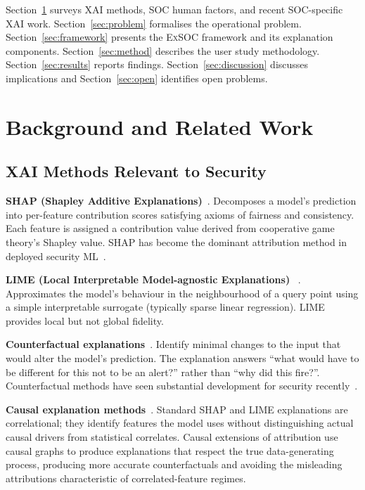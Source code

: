 \documentclass[sigconf,nonacm]{acmart}
\begin{document}
Section~\ref{sec:background} surveys XAI methods, SOC human factors, and
recent SOC-specific XAI work. Section~\ref{sec:problem} formalises the
operational problem. Section~\ref{sec:framework} presents the
\textsc{ExSOC} framework and its explanation components.
Section~\ref{sec:method} describes the user study methodology.
Section~\ref{sec:results} reports findings. Section~\ref{sec:discussion}
discusses implications and Section~\ref{sec:open} identifies open problems.

\section{Background and Related Work}
\label{sec:background}

\subsection{XAI Methods Relevant to Security}

\textbf{SHAP (Shapley Additive Explanations)}~\cite{lundberg2017shap}.
Decomposes a model's prediction into per-feature contribution scores
satisfying axioms of fairness and consistency. Each feature is assigned a
contribution value derived from cooperative game theory's Shapley value.
SHAP has become the dominant attribution method in deployed
security ML~\cite{warnecke2023}.

\textbf{LIME (Local Interpretable Model-agnostic Explanations)}~%
\cite{ribeiro2016lime}. Approximates the model's behaviour in the
neighbourhood of a query point using a simple interpretable surrogate
(typically sparse linear regression). LIME provides local but not global
fidelity.

\textbf{Counterfactual explanations}~\cite{wachter2017counterfactual}.
Identify minimal changes to the input that would alter the model's
prediction. The explanation answers ``what would have to be different for
this not to be an alert?'' rather than ``why did this fire?''. Counterfactual
methods have seen substantial development for security
recently~\cite{liu2024xai,arrieta2023counterfactual}.

\textbf{Causal explanation methods}~\cite{beckers2024causal,janzing2024causal}.
Standard SHAP and LIME explanations are correlational; they identify
features the model uses without distinguishing actual causal drivers from
statistical correlates. Causal extensions of attribution use causal graphs
to produce explanations that respect the true data-generating process,
producing more accurate counterfactuals and avoiding the misleading
attributions characteristic of correlated-feature regimes.
\end{document}
